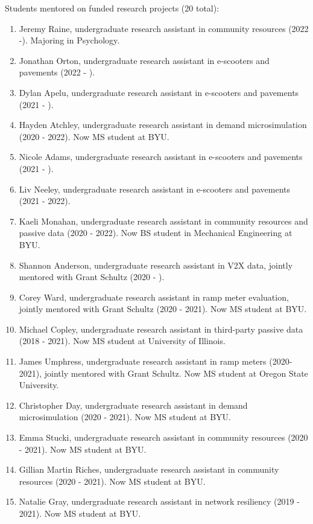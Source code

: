 \documentclass[margin,line]{res}
\newcounter{enuminitialize}
\newenvironment{myenum}[1][]
{%
 \setcounter{enuminitialize}{#1}
 \addtocounter{enuminitialize}{2}
 \begin{enumerate}[left= 4pt, itemsep=12pt, start=\value{enuminitialize}, label=\arabic*\addtocounter{enumi}{-2}]
}
{%
 \end{enumerate}
}
\begin{document}
\begin{resume}
Students mentored on funded research projects (20 total):
\vspace{0.2cm}
\begin{myenum}[22]
  \item Jeremy Raine, undergraduate research assistant in community resources (2022 -). Majoring in Psychology.
  \item Jonathan Orton, undergraduate research assistant in e-scooters and pavements (2022 - ).
  \item Dylan Apelu, undergraduate research assistant in e-scooters and pavements (2021 - ).
  \item Hayden Atchley, undergraduate research assistant in demand microsimulation (2020 - 2022). Now MS student at BYU.
  \item Nicole Adams, undergraduate research assistant in e-scooters and pavements (2021 - ).
  \item Liv Neeley, undergraduate research assistant in e-scooters and pavements (2021 - 2022).
  \item Kaeli Monahan, undergraduate research assistant in community resources and passive data (2020 - 2022). Now BS student in Mechanical Engineering at BYU.
  \item Shannon Anderson, undergraduate research assistant in V2X data, jointly mentored with Grant Schultz (2020 - ).
  \item Corey Ward, undergraduate research assistant in ramp meter evaluation, jointly mentored with Grant Schultz (2020 - 2021). Now MS student at BYU.
  \item Michael Copley, undergraduate research assistant in third-party passive data (2018 - 2021). Now MS student at University of Illinois.
  \item James Umphress, undergraduate research assistant in ramp meters (2020-2021), jointly mentored with Grant Schultz. Now MS student at Oregon State University.
  \item Christopher Day, undergraduate research assistant in demand microsimulation (2020 - 2021). Now MS student at BYU.
  \item Emma Stucki, undergraduate research assistant in community resources (2020 - 2021). Now MS student at BYU.
  \item Gillian Martin Riches, undergraduate research assistant in community resources (2020 - 2021). Now MS student at BYU.
  \item Natalie Gray, undergraduate research assistant in network resiliency (2019 - 2021). Now MS student at BYU.

\end{myenum}
\end{resume}
\end{document}
